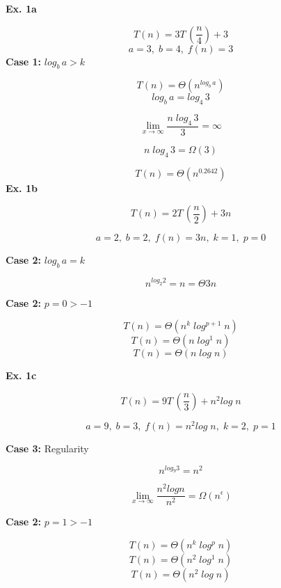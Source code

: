 \documentclass[12pt,letterpaper,final]{report}
\begin{document}
\vline

\noindent\textbf{Ex. 1a}  

\[
T(n) = 3T \, (\frac{n}{4}) + 3
\]
\[
a = 3, \;  b = 4, \;  f(n) = 3 
\]
\noindent\textbf{Case 1:} $log_b\, a > k$ 
 
\[
T (n) = \Theta(n^{log_b \,a})
\]
\[
 log_b \, a = log_4 \,3 
\]

\[
\lim_{x\to\infty} \frac{n \; log_4 \,3}{3} = \infty
\]

\[
n \; log_4 \,3  = \Omega (3) 
\]

\[
T (n) = \Theta(n^{0.2642})
\]
\bigskip
\bigskip
\noindent\textbf{Ex. 1b}

\[
T(n) = 2T \, (\frac{n}{2}) + 3n
\]

\[
a = 2, \;  b = 2, \;  f(n) = 3n, \; k = 1, \; p = 0
\]

\noindent\textbf{Case 2:} $log_b\, a = k$ 

\[
n^{log_2 2} = n  = \Theta 3n 
\]

\noindent\textbf{Case 2:} $p = 0 > -1 $ 

\[
T(n) = \Theta (n^k \;log^{p+1}  \; n)
\]
\[
T(n) = \Theta (n \;log^{1}  \; n)
\]
\[
T(n) = \Theta (n\;log \; n)
\]

\bigskip
\bigskip
\noindent\textbf{Ex. 1c}

\[
T(n) = 9T \, (\frac{n}{3}) + n^2 log\; n 
\]

\[
a = 9, \;  b = 3, \;  f(n) = n^2 log\; n, \; k = 2, \; p = 1
\]

\noindent\textbf{Case 3:} Regularity  

\[
n^{log_9 3} = n^2  
\]

\[
\lim_{x\to\infty} \frac{n^2 log n}{n^2}= \Omega(n^\epsilon)
\]

\noindent\textbf{Case 2:} $p = 1 > -1$ 

\[
T(n) = \Theta (n^k \;log^{p}  \; n)
\]
\[
T(n) = \Theta (n^2 \;log^{1}  \; n)
\]
\[
T(n) = \Theta (n^2\;log \; n)
\]
\end{document}
